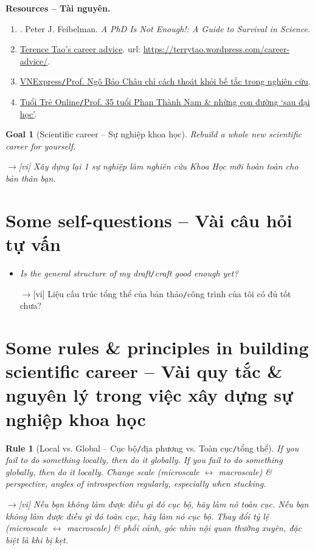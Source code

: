 \documentclass[12pt,oneside]{book}
\newtheorem{goal}{Goal}
\newtheorem{Rule}{Rule}
\begin{document}
\noindent\textbf{\textsf{Resources -- Tài nguyên.}}
\begin{enumerate}
	\item \cite{Feibelman2011}. {\sc Peter J. Feibelman}. {\it A PhD Is Not Enough!: A Guide to Survival in Science}.
	\item \href{https://terrytao.wordpress.com/career-advice/}{{\sc Terence Tao}'s career advice}. {\sc url}: \url{https://terrytao.wordpress.com/career-advice/}.
	\item \href{https://vnexpress.net/gs-ngo-bao-chau-chi-cach-thoat-khoi-be-tac-trong-nghien-cuu-4446449.html}{VNExpress{\tt/}Prof. {\sc Ngô Bảo Châu} chỉ cách thoát khỏi bế tắc trong nghiên cứu}.
	\item \href{https://tuoitre.vn/giao-su-35-tuoi-phan-thanh-nam-va-nhung-con-duong-sau-dai-hoc-20200515114136566.htm}{Tuổi Trẻ Online{\tt/}Prof. 35 tuổi {\sc Phan Thành Nam} \& những con đường `sau đại học'}.
\end{enumerate}

\begin{goal}[Scientific career -- Sự nghiệp khoa học]
	Rebuild a whole new scientific career for yourself.
	
	{\sf[en]$\to$[vi]} Xây dựng lại 1 sự nghiệp làm nghiên cứu Khoa Học mới hoàn toàn cho bản thân bạn.
\end{goal}

\section{Some self-questions -- Vài câu hỏi tự vấn}

\begin{itemize}
	\item {\it Is the general structure of my draft{\tt/}craft good enough yet?}
	
	{\sf[en]$\to$[vi]} Liệu cấu trúc tổng thể của bản thảo{\tt/}công trình của tôi có đủ tốt chưa?
\end{itemize}

\section{Some rules \& principles in building scientific career -- Vài quy tắc \& nguyên lý trong việc xây dựng sự nghiệp khoa học}

\begin{Rule}[Local vs. Global -- Cục bộ{\tt/}địa phương vs. Toàn cục{\tt/}tổng thể]
	If you fail to do something locally, then do it globally. If you fail to do something globally, then do it locally. Change scale (microscale $\leftrightarrow$ macroscale) \& perspective, angles of introspection regularly, especially when stucking.
	
	{\sf[en]$\to$[vi]} Nếu bạn không làm được điều gì đó cục bộ, hãy làm nó toàn cục. Nếu bạn không làm được điều gì đó toàn cục, hãy làm nó cục bộ. Thay đổi tỷ lệ (microscale $\leftrightarrow$ macroscale) \& phối cảnh, góc nhìn nội quan thường xuyên, đặc biệt là khi bị kẹt.
\end{Rule}
\end{document}

